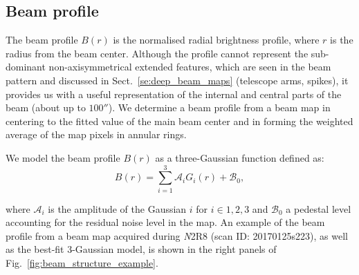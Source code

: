 



\subsection{Beam profile}
\label{se:fullbeam_prof}

The beam profile $B(r)$ is the normalised radial brightness profile, where $r$ is the radius from the beam center.
Although the profile cannot represent the sub-dominant non-axisymmetrical
extended features, which are seen in the beam pattern and discussed in
Sect.~\ref{se:deep_beam_maps} (telescope arms, spikes), it provides us with a useful
representation of the internal and central parts of the beam (about up to
$100''$). We determine a beam profile from a beam map in centering to
the fitted value of the main beam center and in forming the
weighted average of the map pixels in annular rings.

We model the beam profile $B(r)$ as a three-Gaussian function defined as:
\begin{equation}
  B(r) = \sum_{i=1}^{3} \mathcal{A}_i G_i(r) + \mathcal{B}_0,
  \label{eq:3gauss}
\end{equation}

where $\mathcal{A}_i$ is the amplitude of the Gaussian $i$ for $i \in {1, 2, 3}$ and
$\mathcal{B}_0$ a pedestal level accounting for the residual noise
level in the map.
An example of the beam profile from a beam map acquired during {\emph N2R8} (scan ID:
20170125s223), as well as the best-fit 3-Gaussian model, is shown in
the right panels of Fig.~\ref{fig:beam_structure_example}.



